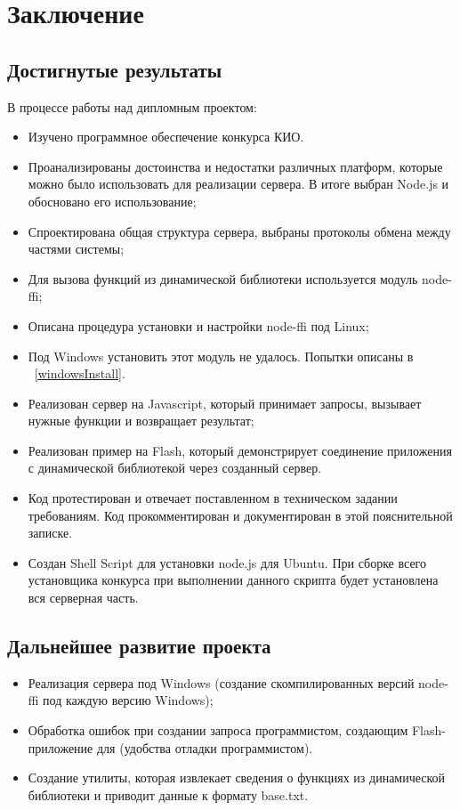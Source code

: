 \chapter{Заключение}
\section{Достигнутые результаты}
В процессе работы над дипломным проектом:
\begin{itemize}
  \item Изучено программное обеспечение конкурса КИО.
  \item Проанализированы достоинства и недостатки различных платформ, которые можно было использовать для реализации сервера. В итоге выбран Node.js и обосновано его использование;
  \item Спроектирована общая структура сервера, выбраны протоколы обмена между частями системы;
  \item Для вызова функций из динамической библиотеки используется модуль node-ffi;
  \item Описана процедура установки и настройки node-ffi под Linux;
  \item Под Windows установить этот модуль не удалось. Попытки описаны в ~\ref{windowsInstall}. 
  \item Реализован сервер на Javascript, который принимает запросы, вызывает нужные функции и возвращает результат;
  \item Реализован пример на Flash, который демонстрирует соединение приложения с динамической библиотекой через созданный сервер.
  \item Код протестирован и отвечает поставленном в техническом задании требованиям. Код прокомментирован и документирован в этой пояснительной записке.
  \item Создан Shell Script для установки node.js для Ubuntu. При сборке всего установщика конкурса при выполнении данного скрипта будет установлена вся серверная часть. 
\end{itemize}
\section{Дальнейшее развитие проекта}
\begin{itemize}
  \item Реализация сервера под Windows (создание скомпилированных версий node-ffi под каждую версию Windows);
  \item Обработка ошибок при создании запроса программистом, создающим Flash-приложение для (удобства отладки программистом).
  \item Создание утилиты, которая извлекает сведения о функциях из динамической библиотеки и приводит данные к формату base.txt.
\end{itemize}
